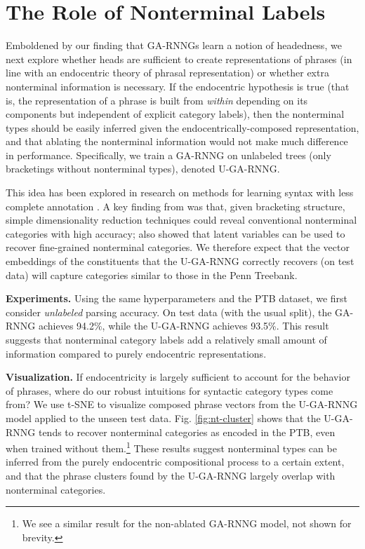 \documentclass[11pt]{article}
\begin{document}
\section{The Role of Nonterminal Labels}\label{sec:bracketing}


Emboldened by our finding that GA-RNNGs learn a notion of headedness, we next explore whether heads are sufficient to create representations of phrases (in line with an endocentric theory of phrasal representation) or whether extra nonterminal information is necessary.  If the endocentric hypothesis is true (that is, the representation of a phrase is built from \emph{within} depending on its components but independent of explicit category labels), then the nonterminal types should be easily inferred given the endocentrically-composed representation, and that ablating the nonterminal information would not make much difference in performance. Specifically, we train a GA-RNNG on unlabeled trees (only bracketings without nonterminal types), denoted U-GA-RNNG.  

This idea has been explored in research on methods for learning syntax with less complete annotation \cite{pereira-92}.   A key finding from  was that, given bracketing structure, simple dimensionality reduction techniques could reveal conventional nonterminal categories with high accuracy;  also showed that latent variables can be used to recover fine-grained nonterminal categories.  We therefore expect that the vector embeddings of the constituents that the U-GA-RNNG correctly recovers (on test data) will capture categories similar to those in the Penn Treebank. 

\textbf{Experiments.} Using the same hyperparameters and the PTB dataset, we first consider \emph{unlabeled}  parsing accuracy.  On test data (with the usual split), the GA-RNNG achieves 94.2\%, while the U-GA-RNNG achieves 93.5\%. This result suggests that nonterminal category labels add a relatively small amount of information compared to purely endocentric representations.







\textbf{Visualization.} If endocentricity is largely sufficient to account for the behavior of phrases, where do our robust intuitions for syntactic category types come from? We use t-SNE \cite{maaten_08} to visualize composed phrase vectors from the U-GA-RNNG model applied to the unseen test data.
Fig. \ref{fig:nt-cluster} shows that the U-GA-RNNG tends to recover nonterminal categories as encoded in the PTB, even when trained without them.\footnote{We see a similar result for the non-ablated GA-RNNG model, not shown for brevity.} These results suggest nonterminal types can be inferred from the purely endocentric compositional process to a certain extent, and that the phrase clusters found by the U-GA-RNNG largely overlap with nonterminal categories.  
\end{document}

